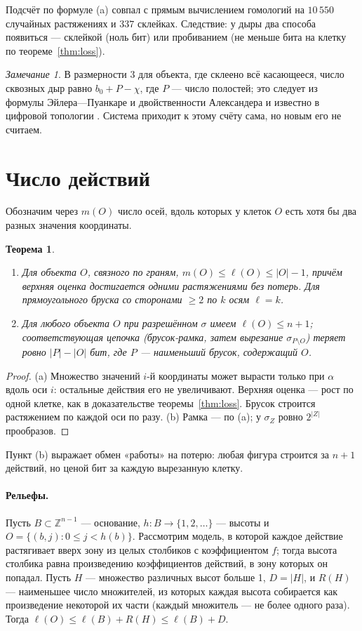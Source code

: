 \documentclass[11pt,a4paper]{article}
\theoremstyle{plain}
\newtheorem{theorem}{Теорема}
\theoremstyle{definition}
\theoremstyle{remark}
\newtheorem*{remark}{Замечание}
\newcommand{\Z}{\mathbb{Z}}
\begin{document}
Подсчёт по формуле (a) совпал с прямым вычислением гомологий на $10\,550$ случайных растяжениях и $337$ склейках. Следствие: у дыры два способа появиться — склейкой (ноль бит) или пробиванием (не меньше бита на клетку по теореме~\ref{thm:loss}).

\begin{remark}
В размерности 3 для объекта, где склеено всё касающееся, число сквозных дыр равно $b_0+P-\chi$, где $P$ — число полостей; это следует из формулы Эйлера—Пуанкаре и двойственности Александера и известно в цифровой топологии \cite{toriwaki,kaczynski}. Система приходит к этому счёту сама, но новым его не считаем.
\end{remark}

\section{Число действий}\label{sec:count}

Обозначим через $m(O)$ число осей, вдоль которых у клеток $O$ есть хотя бы два разных значения координаты.

\begin{theorem}\label{thm:bounds}
\begin{enumerate}[label=\upshape(\alph*)]
\item Для объекта $O$, связного по граням, $m(O)\le\ell(O)\le|O|-1$, причём верхняя оценка достигается одними растяжениями без потерь. Для прямоугольного бруска со сторонами $\ge2$ по $k$ осям $\ell=k$.
\item Для любого объекта $O$ при разрешённом $\sigma$ имеем $\ell(O)\le n+1$; соответствующая цепочка (брусок-рамка, затем вырезание $\sigma_{P\setminus O}$) теряет ровно $|P|-|O|$ бит, где $P$ — наименьший брусок, содержащий $O$.
\end{enumerate}
\end{theorem}
\begin{proof}
(a) Множество значений $i$-й координаты может вырасти только при $\alpha$ вдоль оси $i$: остальные действия его не увеличивают. Верхняя оценка — рост по одной клетке, как в доказательстве теоремы~\ref{thm:loss}. Брусок строится растяжением по каждой оси по разу. (b) Рамка — по (a); у $\sigma_Z$ ровно $2^{|Z|}$ прообразов.
\end{proof}

Пункт (b) выражает обмен «работы» на потерю: любая фигура строится за $n+1$ действий, но ценой бит за каждую вырезанную клетку.

\paragraph{Рельефы.} Пусть $B\subset\Z^{n-1}$ — основание, $h\colon B\to\{1,2,\dots\}$ — высоты и $O=\{(b,j):0\le j<h(b)\}$. Рассмотрим модель, в которой каждое действие растягивает вверх зону из целых столбиков с коэффициентом $f$; тогда высота столбика равна произведению коэффициентов действий, в зону которых он попадал. Пусть $H$ — множество различных высот больше 1, $D=|H|$, и $R(H)$ — наименьшее число множителей, из которых каждая высота собирается как произведение некоторой их части (каждый множитель — не более одного раза). Тогда $\ell(O)\le \ell(B)+R(H)\le\ell(B)+D$.
\end{document}
